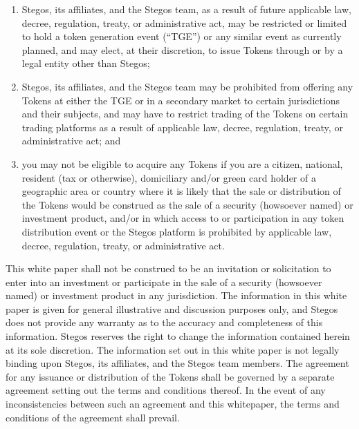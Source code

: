 \documentclass[8pt,fleqn,openany]{book}
\begin{document}
{\begin{enumerate}[label=(\alph*)]
	\item Stegos, its affiliates, and the Stegos team, as a result of future applicable law, decree, regulation, treaty, or administrative act, may be restricted or limited to hold a token generation event (“TGE”) or any similar event as currently planned, and may elect, at their discretion, to issue Tokens through or by a legal entity other than Stegos; 

	\item Stegos, its affiliates, and the Stegos team may be prohibited from offering any Tokens at either the TGE or in a secondary market to certain jurisdictions and their subjects, and may have to restrict trading of the Tokens on certain trading platforms as a result of applicable law, decree, regulation, treaty, or administrative act; and 

	\item you may not be eligible to acquire any Tokens if you are a citizen, national, resident (tax or otherwise), domiciliary and/or green card holder of a geographic area or country where it is likely that the sale or distribution of the Tokens would be construed as the sale of a security (howsoever named) or investment product, and/or in which access to or participation in any token distribution event or the Stegos platform is prohibited by applicable law, decree, regulation, treaty, or administrative act. 

\end{enumerate}

This white paper shall not be construed to be an invitation or solicitation to enter into an investment or participate in the sale of a security (howsoever named) or investment product in any jurisdiction. The information in this white paper is given for general illustrative and discussion purposes only, and Stegos does not provide any warranty as to the accuracy and completeness of this information. Stegos reserves the right to change the information contained herein at its sole discretion. The information set out in this white paper is not legally binding upon Stegos, its affiliates, and the Stegos team members. The agreement for any issuance or distribution of the Tokens shall be governed by a separate agreement setting out the terms and conditions thereof. In the event of any inconsistencies between such an agreement and this whitepaper, the terms and conditions of the agreement shall prevail. 

\newpage \appendix
{}
\addappheadtotoc

}
\end{document}
